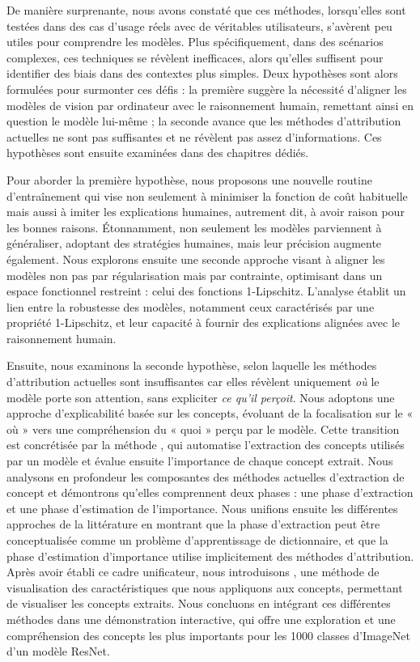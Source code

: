 De manière surprenante, nous avons constaté que ces méthodes, lorsqu'elles sont testées dans des cas d'usage réels avec de véritables utilisateurs, s'avèrent peu utiles pour comprendre les modèles. Plus spécifiquement, dans des scénarios complexes, ces techniques se révèlent inefficaces, alors qu'elles suffisent pour identifier des biais dans des contextes plus simples. Deux hypothèses sont alors formulées pour surmonter ces défis : la première suggère la nécessité d'aligner les modèles de vision par ordinateur avec le raisonnement humain, remettant ainsi en question le modèle lui-même ; la seconde avance que les méthodes d'attribution actuelles ne sont pas suffisantes et ne révèlent pas assez d'informations. Ces hypothèses sont ensuite examinées dans des chapitres dédiés.


Pour aborder la première hypothèse, nous proposons une nouvelle routine d'entraînement qui vise non seulement à minimiser la fonction de coût habituelle mais aussi à imiter les explications humaines, autrement dit, à avoir raison pour les bonnes raisons. Étonnamment, non seulement les modèles parviennent à généraliser, adoptant des stratégies humaines, mais leur précision augmente également. Nous explorons ensuite une seconde approche visant à aligner les modèles non pas par régularisation mais par contrainte, optimisant dans un espace fonctionnel restreint : celui des fonctions 1-Lipschitz. L'analyse établit un lien entre la robustesse des modèles, notamment ceux caractérisés par une propriété 1-Lipschitz, et leur capacité à fournir des explications alignées avec le raisonnement humain.


Ensuite, nous examinons la seconde hypothèse, selon laquelle les méthodes d'attribution actuelles sont insuffisantes car elles révèlent uniquement \textit{où} le modèle porte son attention, sans expliciter \textit{ce qu'il perçoit}. Nous adoptons une approche d'explicabilité basée sur les concepts, évoluant de la focalisation sur le « où » vers une compréhension du « quoi » perçu par le modèle. Cette transition est concrétisée par la méthode \craft, qui automatise l'extraction des concepts utilisés par un modèle et évalue ensuite l'importance de chaque concept extrait. Nous analysons en profondeur les composantes des méthodes actuelles d'extraction de concept et démontrons qu'elles comprennent deux phases : une phase d'extraction et une phase d'estimation de l'importance. Nous unifions ensuite les différentes approches de la littérature en montrant que la phase d'extraction peut être conceptualisée comme un problème d'apprentissage de dictionnaire, et que la phase d'estimation d'importance utilise implicitement des méthodes d'attribution. Après avoir établi ce cadre unificateur, nous introduisons \maco, une méthode de visualisation des caractéristiques que nous appliquons aux concepts, permettant de visualiser les concepts extraits. Nous concluons en intégrant ces différentes méthodes dans une démonstration interactive, qui offre une exploration et une compréhension des concepts les plus importants pour les 1000 classes d'ImageNet d'un modèle ResNet.

